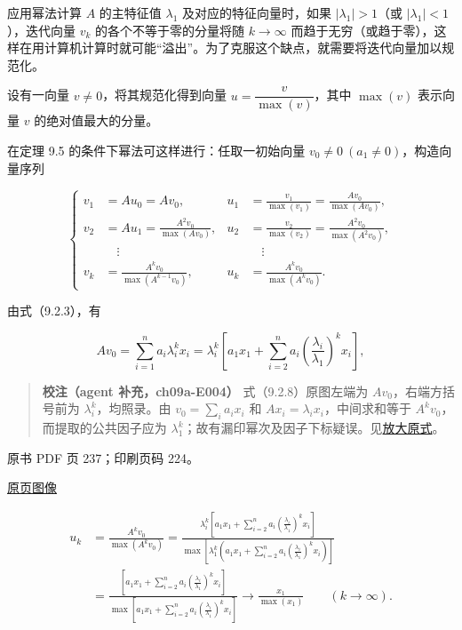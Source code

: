 应用幂法计算 \(A\) 的主特征值 \(\lambda_1\) 及对应的特征向量时，如果 \(|\lambda_1|>1\)（或 \(|\lambda_1|<1\)），迭代向量 \(v_k\) 的各个不等于零的分量将随 \(k\to\infty\) 而趋于无穷（或趋于零），这样在用计算机计算时就可能``溢出''。为了克服这个缺点，就需要将迭代向量加以规范化。

设有一向量 \(v\ne0\)，将其规范化得到向量 \(u=\dfrac{v}{\max(v)}\)，其中 \(\max(v)\) 表示向量 \(v\) 的绝对值最大的分量。

在定理 9.5 的条件下幂法可这样进行：任取一初始向量 \(v_0\ne0\ (a_1\ne0)\)，构造向量序列

\[
\left\{
\begin{aligned}
v_1&=Au_0=Av_0,&u_1&=\frac{v_1}{\max(v_1)}=\frac{Av_0}{\max(Av_0)},\\
v_2&=Au_1=\frac{A^2v_0}{\max(Av_0)},&u_2&=\frac{v_2}{\max(v_2)}=\frac{A^2v_0}{\max(A^2v_0)},\\
&\quad\vdots&&\quad\vdots\\
v_k&=\frac{A^kv_0}{\max(A^{k-1}v_0)},&u_k&=\frac{A^kv_0}{\max(A^kv_0)}.
\end{aligned}
\right.
\]

由式（9.2.3），有

\[
Av_0=\sum_{i=1}^na_i\lambda_i^kx_i=\lambda_i^k\left[a_1x_1+\sum_{i=2}^na_i\left(\frac{\lambda_i}{\lambda_1}\right)^kx_i\right],
\tag{9.2.8}
\]

\begin{quote}
\textbf{校注（agent 补充，ch09a-E004）} 式（9.2.8）原图左端为 \(Av_0\)，右端方括号前为 \(\lambda_i^k\)，均照录。由 \(v_0=\sum_i a_ix_i\) 和 \(Ax_i=\lambda_ix_i\)，中间求和等于 \(A^kv_0\)，而提取的公共因子应为 \(\lambda_1^k\)；故有漏印幂次及因子下标疑误。见\href{verified/assets/ch09a/review-p236-9-2-8.png}{放大原式}。
\end{quote}

\clearpage

原书 PDF 页 237；印刷页码 224。

\href{source-images/pdf-237.jpeg}{原页图像}

\[
\begin{aligned}
u_k&=\frac{A^kv_0}{\max(A^kv_0)}
=\frac{\lambda_i^k\left[a_1x_1+\displaystyle\sum_{i=2}^na_i\left(\frac{\lambda_i}{\lambda_1}\right)^kx_i\right]}{\max\left[\lambda_1^k\left(a_1x_1+\displaystyle\sum_{i=2}^na_i\left(\frac{\lambda_i}{\lambda_1}\right)^kx_i\right)\right]}\\
&=\frac{\left[a_1x_1+\displaystyle\sum_{i=2}^na_i\left(\frac{\lambda_i}{\lambda_1}\right)^kx_i\right]}{\max\left[a_1x_1+\displaystyle\sum_{i=2}^na_i\left(\frac{\lambda_i}{\lambda_1}\right)^kx_i\right]}
\to\frac{x_1}{\max(x_1)}\qquad(k\to\infty).
\end{aligned}
\]

